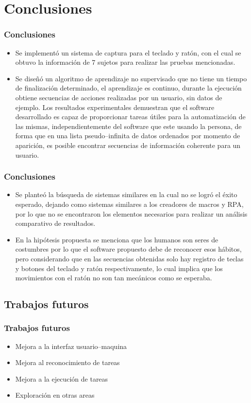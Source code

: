 \section{Conclusiones}

\begin{frame}
\frametitle{Conclusiones}
\begin{itemize}
\item {
Se implement\'o un sistema de captura para el teclado y rat\'on, con el cual
 se obtuvo la informaci\'on de 7 sujetos para realizar las pruebas mencionadas.
}
\item {
Se dise\~n\'o un algoritmo de aprendizaje no supervisado que no tiene un
 tiempo de finalizaci\'on determinado, el aprendizaje es continuo, durante la 
 ejecuci\'on obtiene secuencias de acciones realizadas por un usuario, sin 
 datos de ejemplo. Los resultados experimentales demuestran que el software 
 desarrollado es capaz de proporcionar tareas \'utiles para la 
 automatizaci\'on de las mismas, independientemente del software que este 
 usando la persona, de forma que en una lista pseudo--infinita de datos 
 ordenados por momento de aparici\'on, es posible encontrar secuencias de 
 informaci\'on coherente para un usuario.
}
\end{itemize}
\end{frame}

\begin{frame}
\frametitle{Conclusiones}
\begin{itemize}
\item{
Se plante\'o la b\'usqueda de sistemas similares en la cual no se logr\'o 
 el \'exito esperado, dejando como sistemas similares a los creadores de
 macros y RPA, por lo que no se encontraron los elementos necesarios 
 para realizar un an\'alisis comparativo de resultados.
}
\item {
En la hip\'otesis propuesta se menciona que los humanos son seres de 
 costumbres por lo que el software propuesto debe de reconocer esos h\'abitos, 
 pero considerando que en las secuencias obtenidas solo hay registro de teclas
 y botones del teclado y rat\'on respectivamente, lo cual implica que los
 movimientos con el rat\'on no son tan mec\'anicos como se esperaba.
}
\end{itemize}
\end{frame}


\subsection{Trabajos futuros}
\begin{frame}
\frametitle{Trabajos futuros}

\begin{itemize}
	\item Mejora a la interfaz usuario--maquina
	\item Mejora al reconocimiento de tareas
	\item Mejora a la ejecuci\'on de tareas
	\item Exploraci\'on en otras areas
\end{itemize}

\end{frame}

